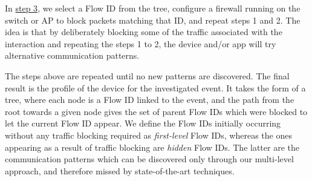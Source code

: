 In \hyperref[sec:event-tree]{step 3}, we select a Flow ID from the tree, configure a firewall running on the switch or AP to block packets matching that ID, and repeat steps 1 and 2. The idea is that by deliberately blocking some of the traffic associated with the interaction and repeating the steps 1 to 2, the device and/or app will try alternative communication patterns.


The steps above are repeated until no new patterns are discovered.
The final result is the profile of the device for the investigated event.
It takes the form of a tree,
where each node is a Flow ID linked to the event,
and the path from the root towards a given node gives
the set of parent Flow IDs which were blocked to let the current Flow ID appear.
We define the Flow IDs initially occurring without any traffic blocking required as \emph{first-level} Flow IDs,
whereas the ones appearing as a result of traffic blocking are \emph{hidden} Flow IDs.
The latter are the communication patterns which can be discovered
only through our multi-level approach,
and therefore missed by state-of-the-art techniques.



